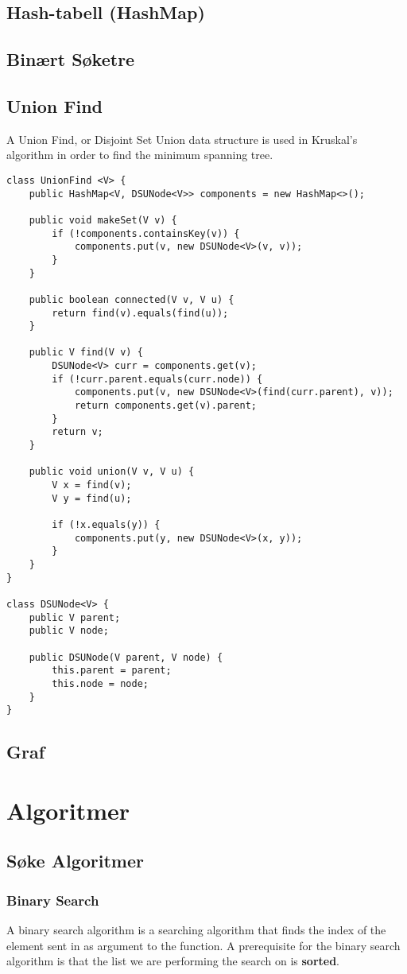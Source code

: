 \documentclass{article}
\begin{document}
    \subsection{Hash-tabell (HashMap)}
    \subsection{Binært Søketre}
    \subsection{Union Find}
    A Union Find, or Disjoint Set Union data structure is used in Kruskal's algorithm in order to find the minimum spanning tree. 
    \begin{lstlisting}
class UnionFind <V> {
	public HashMap<V, DSUNode<V>> components = new HashMap<>();

	public void makeSet(V v) {
		if (!components.containsKey(v)) {
			components.put(v, new DSUNode<V>(v, v));
		}
	}

    public boolean connected(V v, V u) {
        return find(v).equals(find(u));
    }

	public V find(V v) {
		DSUNode<V> curr = components.get(v);
		if (!curr.parent.equals(curr.node)) {
			components.put(v, new DSUNode<V>(find(curr.parent), v));
			return components.get(v).parent;
		}
		return v;
	}

	public void union(V v, V u) {
		V x = find(v);
		V y = find(u);

		if (!x.equals(y)) {
            components.put(y, new DSUNode<V>(x, y));
		}
	}
}

class DSUNode<V> {
	public V parent;
	public V node;

	public DSUNode(V parent, V node) {
		this.parent = parent;
		this.node = node;
	}
}
    \end{lstlisting}
    \subsection{Graf}
    \section{Algoritmer}
    \subsection{Søke Algoritmer}
    \subsubsection{Binary Search}
    A binary search algorithm is a searching algorithm that finds the index of the element sent in as argument to the function. A prerequisite for the binary search algorithm is that the list we are performing the search on is \textbf{sorted}.
\end{document}
